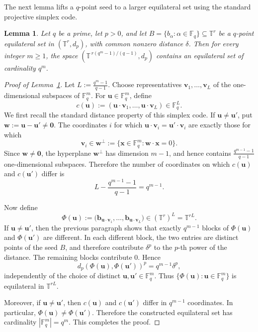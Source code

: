 \documentclass[11pt]{article}
\newtheorem{lemma}[theorem]{Lemma}
\theoremstyle{definition}
\newcommand{\F}{\mathbb{F}}
\newcommand{\T}{\mathbb T}
\begin{document}
The next lemma lifts a \(q\)-point seed to a larger equilateral set using the
standard projective simplex code.
\begin{lemma}\label{lem:simplex-lift-4n}
Let \(q\) be a prime, let \(p>0\), and let
\(
B=\{b_\alpha:\alpha\in\F_q\}\subseteq \T^r
\)
be a \(q\)-point equilateral set in \((\T^r,d_p)\), with common nonzero distance
\(\delta\). Then for every integer \(m\ge1\), the space
\(
\left(\T^{\,r(q^m-1)/(q-1)},d_p\right)
\)
contains an equilateral set of cardinality \(q^m\).
\end{lemma}
\begin{proof}[Proof of Lemma~\ref{lem:simplex-lift-4n}]
Let
\(
L:=\frac{q^m-1}{q-1}.
\)
Choose representatives
\(
\boldsymbol{v}_1,\dots,\boldsymbol{v}_L
\)
of the one-dimensional subspaces of \(\F_q^m\). For
\(\boldsymbol{u}\in\F_q^m\), define
\[
c(\boldsymbol{u})
:=
(\boldsymbol{u}\cdot\boldsymbol{v}_1,\dots,\boldsymbol{u}\cdot\boldsymbol{v}_L)
\in\F_q^L.
\]
We first recall the standard distance property of this simplex code. If
\(\boldsymbol{u}\ne\boldsymbol{u}'\), put
\(
\boldsymbol{w}:=\boldsymbol{u}-\boldsymbol{u}'\ne\boldsymbol{0}.
\)
The coordinates \(i\) for which
\(
\boldsymbol{u}\cdot\boldsymbol{v}_i
=
\boldsymbol{u}'\cdot\boldsymbol{v}_i
\)
are exactly those for which
\[
\boldsymbol{v}_i\in \boldsymbol{w}^{\perp}:=
\{\boldsymbol{x}\in\F_q^m:\boldsymbol{w}\cdot\boldsymbol{x}=0\}.
\]
Since \(\boldsymbol{w}\ne\boldsymbol{0}\), the hyperplane
\(\boldsymbol{w}^{\perp}\) has dimension \(m-1\), and hence contains
\(
\frac{q^{m-1}-1}{q-1}
\)
one-dimensional subspaces. Therefore the number of coordinates on which
\(c(\boldsymbol{u})\) and \(c(\boldsymbol{u}')\) differ is
\[
L-\frac{q^{m-1}-1}{q-1}=q^{m-1}.
\]

Now define
\[
\Phi(\boldsymbol{u})
:=
\bigl(
\boldsymbol{b}_{\boldsymbol{u}\cdot\boldsymbol{v}_1},
\dots,
\boldsymbol{b}_{\boldsymbol{u}\cdot\boldsymbol{v}_L}
\bigr)
\in(\T^r)^L=\T^{rL}.
\]
If \(\boldsymbol{u}\ne\boldsymbol{u}'\), then the previous paragraph shows that
exactly \(q^{m-1}\) blocks of \(\Phi(\boldsymbol{u})\) and
\(\Phi(\boldsymbol{u}')\) are different. In each different block, the two
entries are distinct points of the seed \(B\), and therefore contribute
\(\delta^p\) to the \(p\)-th power of the distance. The remaining blocks
contribute \(0\). Hence
\[
d_p(\Phi(\boldsymbol{u}),\Phi(\boldsymbol{u}'))^p
=
q^{m-1}\delta^p,
\]
independently of the choice of distinct
\(\boldsymbol{u},\boldsymbol{u}'\in\F_q^m\). Thus
\(
\{\Phi(\boldsymbol{u}):\boldsymbol{u}\in\F_q^m\}
\)
is equilateral in \(\T^{rL}\).

Moreover, if \(\boldsymbol{u}\ne\boldsymbol{u}'\), then
\(c(\boldsymbol{u})\) and \(c(\boldsymbol{u}')\) differ in \(q^{m-1}\) coordinates.
In particular, \(\Phi(\boldsymbol{u})\ne\Phi(\boldsymbol{u}')\). Therefore the
constructed equilateral set has cardinality
\(
|\F_q^m|=q^m.
\)
This completes the proof.
\end{proof}
\end{document}
